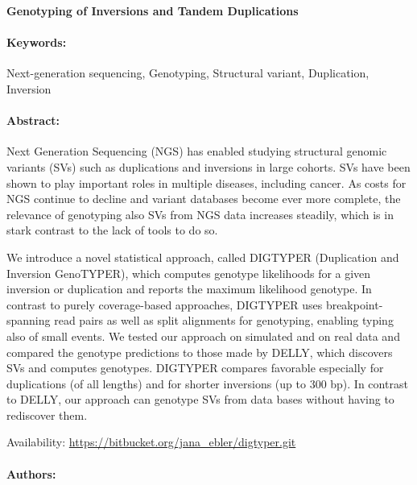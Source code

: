\noindent
\large {\bf Genotyping of Inversions and Tandem Duplications} 


\normalsize 


\noindent \paragraph{Keywords:} Next-generation sequencing, Genotyping, Structural variant, Duplication, Inversion

\noindent \paragraph{Abstract:} 

Next Generation Sequencing (NGS) has enabled studying structural genomic variants (SVs)
such as duplications and inversions in large cohorts. SVs have been shown to play important roles in
multiple diseases, including cancer. As costs for NGS continue to decline and variant databases become
ever more complete, the relevance of genotyping also SVs from NGS data increases steadily, which is in
stark contrast to the lack of tools to do so.

We introduce a novel statistical approach, called DIGTYPER (Duplication and Inversion
GenoTYPER), which computes genotype likelihoods for a given inversion or duplication and reports
the maximum likelihood genotype. In contrast to purely coverage-based approaches, DIGTYPER uses
breakpoint-spanning read pairs as well as split alignments for genotyping, enabling typing also of small
events. We tested our approach on simulated and on real data and compared the genotype predictions to
those made by DELLY, which discovers SVs and computes genotypes. DIGTYPER compares favorable
especially for duplications (of all lengths) and for shorter inversions (up to 300 bp). In contrast to DELLY,
our approach can genotype SVs from data bases without having to rediscover them.

Availability: \url{https://bitbucket.org/jana_ebler/digtyper.git}

\noindent \paragraph{Authors:} 

\noindent \paragraph{} 

